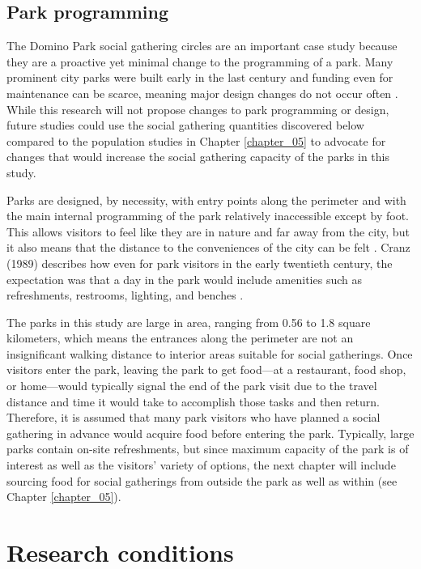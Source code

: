\begin{multicols}{2}

\subsection{Park programming}
The Domino Park social gathering circles are an important case study because they are a proactive yet minimal change to the programming of a park. Many prominent city parks were built early in the last century and funding even for maintenance can be scarce, meaning major design changes do not occur often \cite{havens_parkscapes_2011}. While this research will not propose changes to park programming or design, future studies could use the social gathering quantities discovered below compared to the population studies in Chapter \ref{chapter_05} to advocate for changes that would increase the social gathering capacity of the parks in this study. 

Parks are designed, by necessity, with entry points along the perimeter and with the main internal programming of the park relatively inaccessible except by foot. This allows visitors to feel like they are in nature and far away from the city, but it also means that the distance to the conveniences of the city can be felt \cite{jones_lungs_2018}. Cranz (1989) describes how even for park visitors in the early twentieth century, the expectation was that a day in the park would include amenities such as refreshments, restrooms, lighting, and benches \cite{cranz_politics_1989}. 

The parks in this study are large in area, ranging from 0.56 to 1.8 square kilometers, which means the entrances along the perimeter are not an insignificant walking distance to interior areas suitable for social gatherings. Once visitors enter the park, leaving the park to get food---at a restaurant, food shop, or home---would typically signal the end of the park visit due to the travel distance and time it would take to accomplish those tasks and then return. Therefore, it is assumed that many park visitors who have planned a social gathering in advance would acquire food before entering the park. Typically, large parks contain on-site refreshments, but since maximum capacity of the park is of interest as well as the visitors' variety of options, the next chapter will include sourcing food for social gatherings from outside the park as well as within (see Chapter \ref{chapter_05}).

\section{Research conditions}

\end{multicols}
